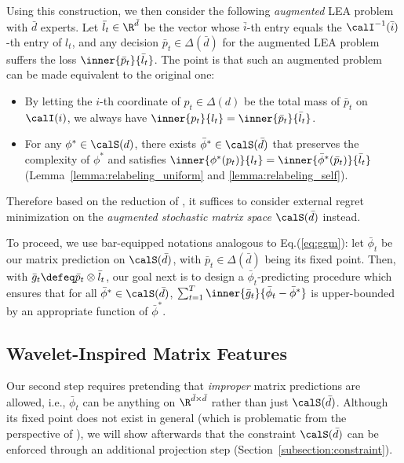 \documentclass[10pt]{article}
\begin{document}
Using this construction, we then consider the following \emph{augmented} LEA problem with $\bar d$ experts. Let $\bar l_t\in\R^{\bar d}$ be the vector whose $\bar i$-th entry equals the $\calI^{-1}(\bar i)$-th entry of $l_t$, and any decision $\bar p_t\in\Delta(\bar d)$ for the augmented LEA problem suffers the loss $\inner{\bar p_t}{\bar l_t}$. The point is that such an augmented problem can be made equivalent to the original one: 
\begin{itemize}
\item By letting the $i$-th coordinate of $p_t\in\Delta(d)$ be the total mass of $\bar p_t$ on $\calI(i)$, we always have $\inner{p_t}{l_t}=\inner{\bar p_t}{\bar l_t}$. 
\item For any $\phi^*\in\calS(d)$, there exists $\bar\phi^*\in\calS(\bar d)$ that preserves the complexity of $\phi^*$ and satisfies $\inner{\phi^*(p_t)}{l_t}=\inner{\bar\phi^*(\bar p_t)}{\bar l_t}$ (Lemma~\ref{lemma:relabeling_uniform} and \ref{lemma:relabeling_self}). 
\end{itemize}
Therefore based on the reduction of \cite{gordon2008no}, it suffices to consider external regret minimization on the \emph{augmented stochastic matrix space} $\calS(\bar d)$ instead. 

To proceed, we use bar-equipped notations analogous to Eq.(\ref{eq:ggm}): let $\bar \phi_t$ be our matrix prediction on $\calS(\bar d)$, with $\bar p_t\in\Delta(\bar d)$ being its fixed point. Then, with $\bar g_t\defeq \bar p_t\otimes \bar l_t$, our goal next is to design a $\bar \phi_t$-predicting procedure which ensures that for all $\bar \phi^*\in\calS(\bar d)$, $\sum_{t=1}^T\inner{\bar g_t}{\bar \phi_t-\bar \phi^*}$ is upper-bounded by an appropriate function of $\bar \phi^*$. 

\subsection{Wavelet-Inspired Matrix Features}\label{subsection:wavelet}

Our second step requires pretending that \emph{improper} matrix predictions are allowed, i.e., $\bar \phi_t$ can be anything on $\R^{\bar d\times \bar d}$ rather than just $\calS(\bar d)$. Although its fixed point does not exist in general (which is problematic from the perspective of \cite{gordon2008no}), we will show afterwards that the constraint $\calS(\bar d)$ can be enforced through an additional projection step (Section~\ref{subsection:constraint}). 
\end{document}
